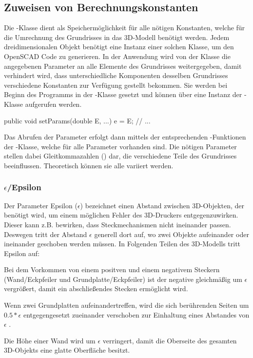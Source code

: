 \subsection{Zuweisen von Berechnungskonstanten}
\label{params}
Die -Klasse dient als Speichermöglichkeit für alle nötigen Konstanten, welche für die Umrechnung des Grundrisses in das 3D-Modell benötigt werden.
Jedem dreidimensionalen Objekt benötigt eine Instanz einer solchen Klasse, um den OpenSCAD Code zu generieren.
In der Anwendung wird von der Klasse  die angegebenen Parameter an alle Elemente des Grundrisses weitergegeben, damit verhindert wird, dass unterschiedliche Komponenten desselben Grundrisses verschiedene Konstanten zur Verfügung gestellt bekommen.
Sie werden bei Beginn des Programms in der -Klasse gesetzt und können über eine Instanz der -Klasse aufgerufen werden. \\

\begin{code} 
	public void setParams(double E, ...){
		e = E;
		// ...
	}
\end{code}

Das Abrufen der Parameter erfolgt dann mittels der entsprechenden -Funktionen der -Klasse, welche für alle Parameter vorhanden sind. 
Die nötigen Parameter stellen dabei Gleitkommazahlen () dar, die verschiedene Teile des Grundrisses beeinflussen. 
Theoretisch können sie alle variiert werden.

\subsubsection{$\epsilon$/Epsilon}
Der Parameter Epsilon ($\epsilon$) bezeichnet einen Abstand zwischen 3D-Objekten, der benötigt wird, um einem möglichen Fehler des 3D-Druckers entgegenzuwirken.
Dieser kann z.B. bewirken, dass Steckmechanismen nicht ineinander passen.
Deswegen tritt der Abstand $\epsilon$ generell dort auf, wo zwei Objekte aufeinander oder ineinander geschoben werden müssen.
In Folgenden Teilen des 3D-Modells tritt Epsilon auf:

\begin{compactenum}
	\item Bei dem Vorkommen von einem positven und einem negativem Steckern (Wand/Eckpfeiler und Grundplatte/Eckpfeiler) ist der negative gleichmäßig um $\epsilon$ vergrößert, damit ein abschließendes Stecken ermöglicht wird.
	\item Wenn zwei Grundplatten aufeinandertreffen, wird die sich berührenden Seiten um $0.5*\epsilon$ entgegengesetzt zueinander verschoben zur Einhaltung eines Abstandes von $\epsilon$ .
	\item Die Höhe einer Wand wird um $\epsilon$ verringert, damit die Oberseite des gesamten 3D-Objekts eine glatte Oberfläche besitzt.
\end{compactenum}

